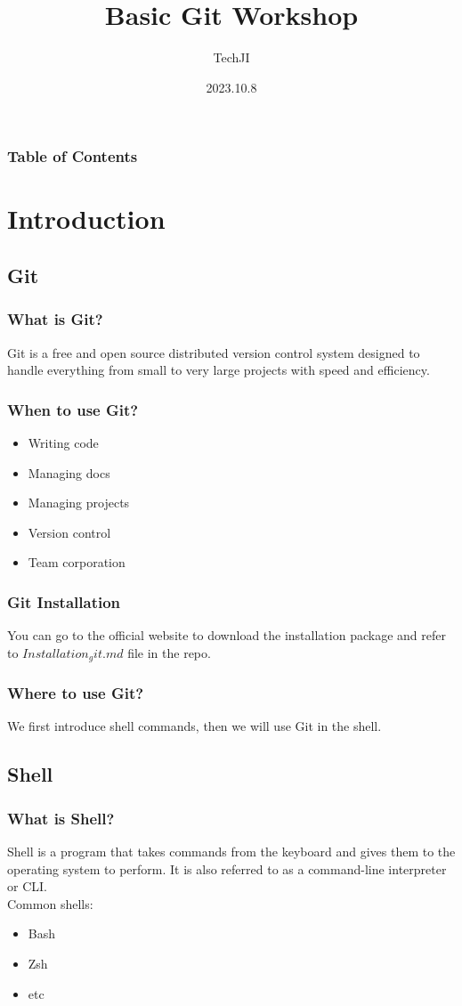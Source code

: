 \documentclass[aspectratio=169]{beamer}
\title[Course number]{Basic Git Workshop}
\author[]{TechJI}
\institute[UMJI-SJTU]
{
	University of Michigan - Shanghai Jiaotong University
	\\\medskip
	Joint Institute
}
\date{2023.10.8}
\begin{document}
\maketitle
\begin{frame}
  \frametitle{Table of Contents}
  \tableofcontents
\end{frame}

\section{Introduction}
\subsection{Git}
\begin{frame}
  \frametitle{What is Git?}
  Git is a free and open source distributed version control system designed to handle everything from small to very large projects with speed and efficiency.
\end{frame}

\begin{frame}
  \frametitle{When to use Git?}

  \begin{itemize}
    \item Writing code
    \item Managing docs
    \item Managing projects
    \item Version control
    \item Team corporation
  \end{itemize}

\end{frame}

\begin{frame}
  \frametitle{Git Installation}
  You can go to the official website to download the installation package and refer to $Installation_git.md$ file in the repo.
\end{frame}

\begin{frame}
  \frametitle{Where to use Git?}
  We first introduce shell commands, then we will use Git in the shell.
\end{frame}

\subsection{Shell}
\begin{frame}
  \frametitle{What is Shell?}
  Shell is a program that takes commands from the keyboard and gives them to the operating system to perform. It is also referred to as a command-line interpreter or CLI.
  \\
  Common shells:
  \begin{itemize}
    \item Bash
    \item Zsh
    \item etc
  \end{itemize}
\end{frame}
\end{document}
